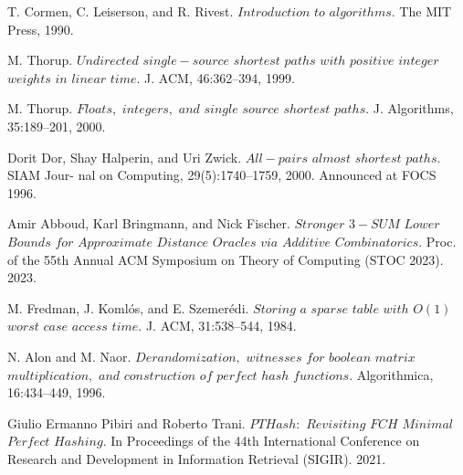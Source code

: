 \documentclass[shortabstract, lic, english]{iithesis}
\theoremstyle{definition} \newtheorem{definition}{Definition}[chapter]
\theoremstyle{remark} \newtheorem{remark}[definition]{Observation}
\theoremstyle{plain} \newtheorem{theorem}[definition]{Theorem}
\theoremstyle{plain} \newtheorem{lemma}[definition]{Lemma}
\theoremstyle{plain} \newtheorem{conjecture}[definition]{Conjecture}
\begin{document}
\begin{thebibliography}{1}

T. Cormen, C. Leiserson, and R. Rivest. $Introduction$ $to$ $algorithms.$
The MIT Press, 1990.

M. Thorup. $Undirected$ $single-source$ $shortest$ $paths$ $with$ $positive$
$integer$ $weights$ $in$ $linear$ $time.$ J. ACM, 46:362–394, 1999.

M. Thorup. $Floats,$ $integers,$ $and$ $single$ $source$ $shortest$ $paths.$ J.
Algorithms, 35:189–201, 2000.

Dorit Dor, Shay Halperin, and Uri Zwick. $All-pairs$ $almost$ $shortest$ $paths.$ SIAM Jour-
nal on Computing, 29(5):1740–1759, 2000. Announced at FOCS 1996.

Amir Abboud, Karl Bringmann, and Nick Fischer. $Stronger$ $3-SUM$ $Lower$ $Bounds$ $for$
$Approximate$ $Distance$ $Oracles$ $via$ $Additive$ $Combinatorics.$ Proc. of the 55th Annual ACM
Symposium on Theory of Computing (STOC 2023). 2023.

M. Fredman, J. Koml\'os, and E. Szemer\'edi. $Storing$ $a$ $sparse$ $table$
$with$ $O(1)$ $worst$ $case$ $access$ $time.$ J. ACM, 31:538–544, 1984.

N. Alon and M. Naor. $Derandomization,$ $witnesses$ $for$ $boolean$
$matrix$ $multiplication,$ $and$ $construction$ $of$ $perfect$ $hash$ $functions.$
Algorithmica, 16:434–449, 1996.

Giulio Ermanno Pibiri and Roberto Trani. $PTHash:$ $Revisiting$ $FCH$ $Minimal$ $Perfect$ $Hashing.$
In Proceedings of the 44th International Conference on Research and Development in Information Retrieval (SIGIR). 2021.

\end{thebibliography}
\end{document}
